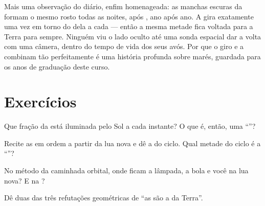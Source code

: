 \begin{remark}\label{rem:g7:moon-phases:sameface}
Mais uma observação do diário, enfim homenageada: as manchas escuras
da  formam o mesmo rosto todas as noites,  após , ano após
ano. A  gira exatamente uma vez em torno do  dela a cada
 --- então a mesma metade fica voltada para a Terra para
sempre. Ninguém viu o lado oculto até uma sonda espacial dar a volta
com uma câmera, dentro do tempo de vida dos seus avós. Por que o giro
e a  combinam tão perfeitamente é uma história profunda sobre
marés, guardada para os anos de graduação deste curso.
\end{remark}

\section{Exercícios}

\begin{exercise}[$\star$]\label{exo:g7:moon-phases:1}
Que fração da  está iluminada pelo Sol a cada instante? O que é,
então, uma ``''?
\end{exercise}

\begin{exercise}[$\star$]\label{exo:g7:moon-phases:2}
Recite as  em ordem a partir da lua nova e dê a  do
ciclo. Qual metade do ciclo é a ``''?
\end{exercise}

\begin{exercise}[$\star$]\label{exo:g7:moon-phases:3}
No método da caminhada orbital, onde ficam a lâmpada, a bola e você
na lua nova? E na ?
\end{exercise}

\begin{exercise}[$\star$]\label{exo:g7:moon-phases:4}
Dê duas das três refutações geométricas de ``as  são a  da
Terra''.
\end{exercise}

